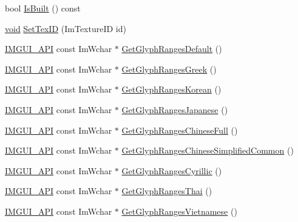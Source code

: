 \begin{DoxyCompactItemize}
\item 
bool \hyperlink{structImFontAtlas_a142ba1470099bbd4b67bdb47be92d475}{Is\+Built} () const
\item 
\hyperlink{imgui__impl__opengl3__loader_8h_ac668e7cffd9e2e9cfee428b9b2f34fa7}{void} \hyperlink{structImFontAtlas_a96ffd1956c11dac4f79b43c095828445}{Set\+Tex\+ID} (Im\+Texture\+ID id)
\item 
\hyperlink{imgui_8h_a43829975e84e45d1149597467a14bbf5}{I\+M\+G\+U\+I\+\_\+\+A\+PI} const Im\+Wchar $\ast$ \hyperlink{structImFontAtlas_adec0df140eb1dc01c2a22a5253d62820}{Get\+Glyph\+Ranges\+Default} ()
\item 
\hyperlink{imgui_8h_a43829975e84e45d1149597467a14bbf5}{I\+M\+G\+U\+I\+\_\+\+A\+PI} const Im\+Wchar $\ast$ \hyperlink{structImFontAtlas_a46d65b05462b548396d3a8ee6644f3ee}{Get\+Glyph\+Ranges\+Greek} ()
\item 
\hyperlink{imgui_8h_a43829975e84e45d1149597467a14bbf5}{I\+M\+G\+U\+I\+\_\+\+A\+PI} const Im\+Wchar $\ast$ \hyperlink{structImFontAtlas_ac70e07bd35913661c8fc50413b3bf969}{Get\+Glyph\+Ranges\+Korean} ()
\item 
\hyperlink{imgui_8h_a43829975e84e45d1149597467a14bbf5}{I\+M\+G\+U\+I\+\_\+\+A\+PI} const Im\+Wchar $\ast$ \hyperlink{structImFontAtlas_a2654afbbf73835bf08278cdc6c181a96}{Get\+Glyph\+Ranges\+Japanese} ()
\item 
\hyperlink{imgui_8h_a43829975e84e45d1149597467a14bbf5}{I\+M\+G\+U\+I\+\_\+\+A\+PI} const Im\+Wchar $\ast$ \hyperlink{structImFontAtlas_ab32e8e79cc4f3b36ef447f70034e7c57}{Get\+Glyph\+Ranges\+Chinese\+Full} ()
\item 
\hyperlink{imgui_8h_a43829975e84e45d1149597467a14bbf5}{I\+M\+G\+U\+I\+\_\+\+A\+PI} const Im\+Wchar $\ast$ \hyperlink{structImFontAtlas_a3a6b1a8afb01ba5e7c4d86957d6d2625}{Get\+Glyph\+Ranges\+Chinese\+Simplified\+Common} ()
\item 
\hyperlink{imgui_8h_a43829975e84e45d1149597467a14bbf5}{I\+M\+G\+U\+I\+\_\+\+A\+PI} const Im\+Wchar $\ast$ \hyperlink{structImFontAtlas_a5aaff3357d9ed401ce451c39942e869e}{Get\+Glyph\+Ranges\+Cyrillic} ()
\item 
\hyperlink{imgui_8h_a43829975e84e45d1149597467a14bbf5}{I\+M\+G\+U\+I\+\_\+\+A\+PI} const Im\+Wchar $\ast$ \hyperlink{structImFontAtlas_a4985c51d8a5270ff027f13fa44a14371}{Get\+Glyph\+Ranges\+Thai} ()
\item 
\hyperlink{imgui_8h_a43829975e84e45d1149597467a14bbf5}{I\+M\+G\+U\+I\+\_\+\+A\+PI} const Im\+Wchar $\ast$ \hyperlink{structImFontAtlas_acc0e66fd4637600ad344c2f415a0ef60}{Get\+Glyph\+Ranges\+Vietnamese} ()

\end{DoxyCompactItemize}
